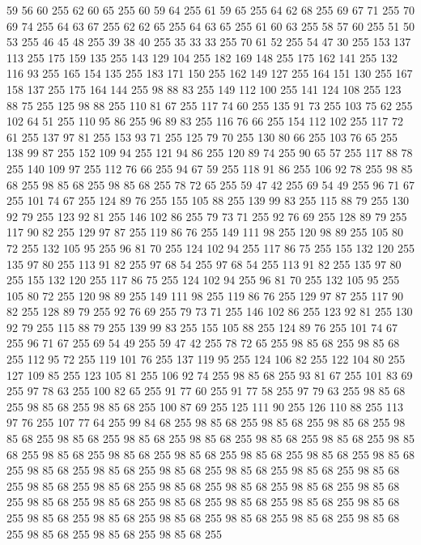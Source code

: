 59 56 60 255 62 60 65 255 60 59 64 255 61 59 65 255 64 62 68 255 69 67 71 255 70 69 74 255 64 63 67 255 62 62 65 255 64 63 65 255 61 60 63 255 58 57 60 255 51 50 53 255 46 45 48 255 39 38 40 255 35 33 33 255 70 61 52 255 54 47 30 255 153 137 113 255 175 159 135 255 143 129 104 255 182 169 148 255 175 162 141 255 132 116 93 255 165 154 135 255 183 171 150 255 162 149 127 255 164 151 130 255 167 158 137 255 175 164 144 255 98 88 83 255 149 112 100 255 141 124 108 255 123 88 75 255 125 98 88 255 110 81 67 255 117 74 60 255 135 91 73 255 103 75 62 255 102 64 51 255 110 95 86 255 96 89 83 255 116 76 66 255 154 112 102 255 117 72 61 255 137 97 81 255 153 93 71 255 125 79 70 255 130 80 66 255 103 76 65 255 138 99 87 255 152 109 94 255 121 94 86 255 120 89 74 255 90 65 57 255 117 88 78 255 140 109 97 255 112 76 66 255 94 67 59 255 118 91 86 255 106 92 78 255 98 85 68 255 98 85 68 255 98 85 68 255
78 72 65 255 59 47 42 255 69 54 49 255 96 71 67 255 101 74 67 255 124 89 76 255 155 105 88 255 139 99 83 255 115 88 79 255 130 92 79 255 123 92 81 255 146 102 86 255 79 73 71 255 92 76 69 255 128 89 79 255 117 90 82 255 129 97 87 255 119 86 76 255 149 111 98 255 120 98 89 255 105 80 72 255 132 105 95 255 96 81 70 255 124 102 94 255 117 86 75 255 155 132 120 255 135 97 80 255 113 91 82 255 97 68 54 255 97 68 54 255 113 91 82 255 135 97 80 255 155 132 120 255 117 86 75 255 124 102 94 255 96 81 70 255 132 105 95 255 105 80 72 255 120 98 89 255 149 111 98 255 119 86 76 255 129 97 87 255 117 90 82 255 128 89 79 255 92 76 69 255 79 73 71 255 146 102 86 255 123 92 81 255 130 92 79 255 115 88 79 255 139 99 83 255 155 105 88 255 124 89 76 255 101 74 67 255 96 71 67 255 69 54 49 255 59 47 42 255 78 72 65 255 98 85 68 255 98 85 68 255 112 95 72 255 119 101 76 255 137 119 95 255 124 106 82 255
122 104 80 255 127 109 85 255 123 105 81 255 106 92 74 255 98 85 68 255 93 81 67 255 101 83 69 255 97 78 63 255 100 82 65 255 91 77 60 255 91 77 58 255 97 79 63 255 98 85 68 255 98 85 68 255 98 85 68 255 100 87 69 255 125 111 90 255 126 110 88 255 113 97 76 255 107 77 64 255 99 84 68 255 98 85 68 255 98 85 68 255 98 85 68 255 98 85 68 255 98 85 68 255 98 85 68 255 98 85 68 255 98 85 68 255 98 85 68 255 98 85 68 255 98 85 68 255 98 85 68 255 98 85 68 255 98 85 68 255 98 85 68 255 98 85 68 255 98 85 68 255 98 85 68 255 98 85 68 255 98 85 68 255 98 85 68 255 98 85 68 255 98 85 68 255 98 85 68 255 98 85 68 255 98 85 68 255 98 85 68 255 98 85 68 255 98 85 68 255 98 85 68 255 98 85 68 255 98 85 68 255 98 85 68 255 98 85 68 255 98 85 68 255 98 85 68 255 98 85 68 255 98 85 68 255 98 85 68 255 98 85 68 255 98 85 68 255 98 85 68 255 98 85 68 255

